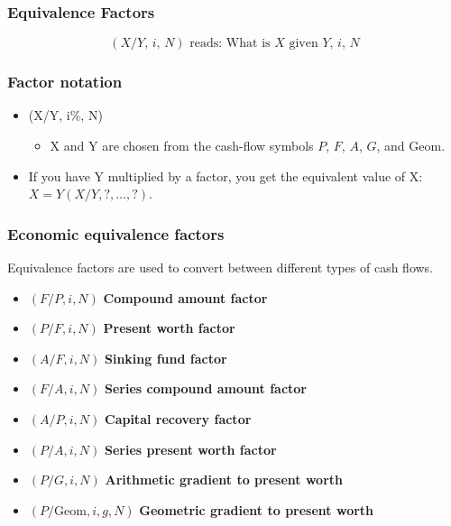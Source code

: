     \subsubsection{Equivalence Factors}
    \begin{definition}
        \[
        \left(X/Y, \, i, \, N\right) \text{ reads: } \text{What is } X \text{ given } Y, \, i, \, N
        \]
    \end{definition}

    \subsubsection{Factor notation}
    \begin{definition}
        \begin{itemize}
            \item (X/Y, i\%, N) 
            \begin{itemize}
                \item X and Y are chosen from the cash-flow symbols \( P \), \( F \), \( A \), \( G \), and Geom.
            \end{itemize}
            \item If you have Y multiplied by a factor, you get the equivalent value of X: \( X = Y(X/Y, ?, \ldots,?) \).
        \end{itemize}
    \end{definition}

    \subsubsection{Economic equivalence factors}
    \begin{definition}
        Equivalence factors are used to convert between different types of cash flows. 
        \begin{itemize}
            \item \((F/P, i, N)\) \textbf{Compound amount factor}
            \item \((P/F, i, N)\) \textbf{Present worth factor}
            \item \((A/F, i, N)\) \textbf{Sinking fund factor}
            \item \((F/A, i, N)\) \textbf{Series compound amount factor}
            \item \((A/P, i, N)\) \textbf{Capital recovery factor}
            \item \((P/A, i, N)\) \textbf{Series present worth factor}
            \item $(P/G, i, N)$ \textbf{Arithmetic gradient to present worth}
            \item $(P/\text{Geom}, i, g, N)$ \textbf{Geometric gradient to present worth}
        \end{itemize}
    \end{definition}

